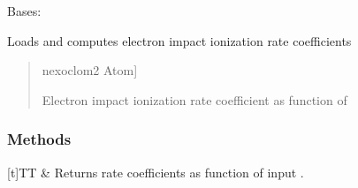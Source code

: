 \documentclass[letterpaper,10pt,english]{sphinxmanual}
\begin{document}
\begin{fulllineitems}
\label{\detokenize{nexoclom2/nexoclom2.atomicdata.eimp_ionization_coef:nexoclom2.atomicdata.eimp_ionization_coef.EimpIonizationCoef}}
\pysigstartsignatures
\pysiglinewithargsret
{}
{}
{}
\pysigstopsignatures
\sphinxAtStartPar
Bases: 

\sphinxAtStartPar
Loads and computes electron impact ionization rate coefficients
\begin{quote}\begin{description}
\begin{description}
\sphinxlineitem{\sphinxstylestrong{species}}{[}nexoclom2 Atom{]}
\end{description}

\begin{description}
\sphinxAtStartPar
Electron impact ionization rate coefficient as function of 

\end{description}

\end{description}\end{quote}
\subsubsection*{Methods}


\begin{savenotes}\sphinxattablestart
\sphinxthistablewithglobalstyle
\centering
\begin{tabulary}{\linewidth}[t]{TT}
\sphinxtoprule
\sphinxtableatstartofbodyhook
\sphinxAtStartPar
{}
&
\sphinxAtStartPar
Returns rate coefficients as function of input .
\\
\sphinxbottomrule
\end{tabulary}
\sphinxtableafterendhook\par
\sphinxattableend\end{savenotes}


\end{fulllineitems}
\end{document}
